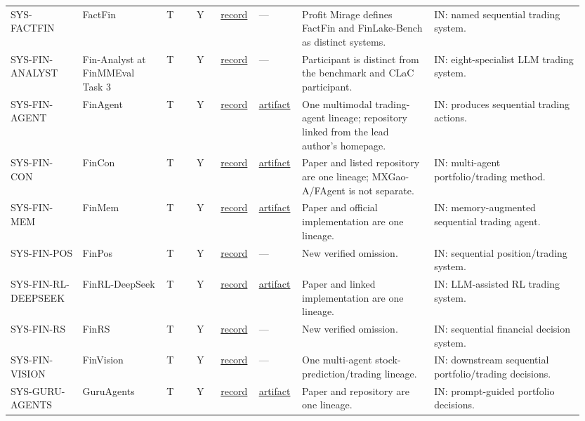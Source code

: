\begin{longtable}{@{}L{0.12\linewidth}L{0.14\linewidth}L{0.05\linewidth}L{0.04\linewidth}L{0.06\linewidth}L{0.07\linewidth}L{0.22\linewidth}L{0.25\linewidth}@{}}
SYS-\allowbreak{}FACTFIN & FactFin & T & Y & \href{https://arxiv.org/abs/2510.07920}{record} & --- & Profit Mirage defines FactFin and FinLake-Bench as distinct systems. & IN: named sequential trading system. \\
SYS-\allowbreak{}FIN-\allowbreak{}ANALYST & Fin-Analyst at FinMMEval Task 3 & T & Y & \href{https://arxiv.org/abs/2607.12233}{record} & --- & Participant is distinct from the benchmark and CLaC participant. & IN: eight-specialist LLM trading system. \\
SYS-\allowbreak{}FIN-\allowbreak{}AGENT & FinAgent & T & Y & \href{https://arxiv.org/abs/2402.18485}{record} & \href{https://github.com/DVampire/FinAgent}{artifact} & One multimodal trading-agent lineage; repository linked from the lead author's homepage. & IN: produces sequential trading actions. \\
SYS-\allowbreak{}FIN-\allowbreak{}CON & FinCon & T & Y & \href{https://arxiv.org/abs/2407.06567}{record} & \href{https://github.com/The-FinAI/FinCon}{artifact} & Paper and listed repository are one lineage; MXGao-A/FAgent is not separate. & IN: multi-agent portfolio/trading method. \\
SYS-\allowbreak{}FIN-\allowbreak{}MEM & FinMem & T & Y & \href{https://arxiv.org/abs/2311.13743}{record} & \href{https://github.com/pipiku915/finmem-llm-stocktrading}{artifact} & Paper and official implementation are one lineage. & IN: memory-augmented sequential trading agent. \\
SYS-\allowbreak{}FIN-\allowbreak{}POS & FinPos & T & Y & \href{https://arxiv.org/abs/2510.27251}{record} & --- & New verified omission. & IN: sequential position/trading system. \\
SYS-\allowbreak{}FIN-\allowbreak{}RL-\allowbreak{}DEEPSEEK & FinRL-DeepSeek & T & Y & \href{https://arxiv.org/abs/2502.07393}{record} & \href{https://github.com/benstaf/FinRL\_DeepSeek}{artifact} & Paper and linked implementation are one lineage. & IN: LLM-assisted RL trading system. \\
SYS-\allowbreak{}FIN-\allowbreak{}RS & FinRS & T & Y & \href{https://arxiv.org/abs/2511.12599}{record} & --- & New verified omission. & IN: sequential financial decision system. \\
SYS-\allowbreak{}FIN-\allowbreak{}VISION & FinVision & T & Y & \href{https://arxiv.org/abs/2411.08899}{record} & --- & One multi-agent stock-prediction/trading lineage. & IN: downstream sequential portfolio/trading decisions. \\
SYS-\allowbreak{}GURU-\allowbreak{}AGENTS & GuruAgents & T & Y & \href{https://arxiv.org/abs/2510.01664}{record} & \href{https://github.com/yejining99/GuruAgents}{artifact} & Paper and repository are one lineage. & IN: prompt-guided portfolio decisions. \\

\end{longtable}
